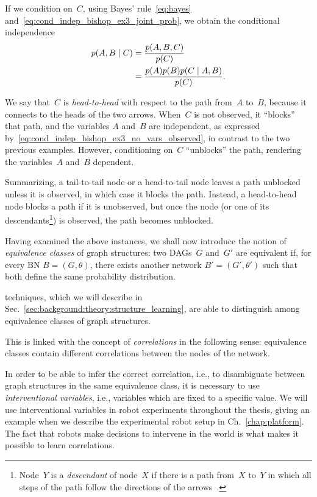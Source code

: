 If we condition on~$C$, using Bayes' rule~\eqref{eq:bayes} and~\eqref{eq:cond_indep_bishop_ex3_joint_prob}, we obtain the conditional independence
\begin{align*}
\begin{split}
  p(A,B \mid C) &= \frac{p(A,B,C)}{p(C)} \\
                  &= \frac{p(A) p(B) p(C \mid A,B)}{p(C)}.
\end{split}
\end{align*}

We say that~$C$ is \emph{head-to-head} with respect to the path from~$A$ to~$B$, because it connects to the heads of the two arrows. \label{head_to_head}
When~$C$ is not observed, it ``blocks'' that path, and the variables $A$ and~$B$ are independent, as expressed by~\eqref{eq:cond_indep_bishop_ex3_no_vars_observed}, in contrast to the two previous examples.
However, conditioning on~$C$ ``unblocks'' the path, rendering the variables~$A$ and~$B$ dependent.

Summarizing, a tail-to-tail node or a head-to-tail node leaves a path unblocked unless it is observed, in which case it blocks the path.
Instead, a head-to-head node blocks a path if it is unobserved, but once the node
(or one of its descendants\footnote{Node~$Y$ is a \emph{descendant} of node~$X$ if there is a path from~$X$ to~$Y$ in which all steps of the path follow the directions of the arrows~\cite[p.~376]{bishop:prml}.})
is observed, the path becomes unblocked.

Having examined the above instances, we shall now introduce the notion of \emph{equivalence classes} of graph structures:
two \acp{DAG}~$G$ and~$G'$ are equivalent if, for every \ac{BN} $B = (G, \theta)$, there exists another network $B' = (G', \theta')$ such that both define the same probability distribution.

\StructureLearning{} techniques, which we will describe in Sec.~\ref{sec:background:theory:structure_learning}, are able to distinguish among equivalence classes of graph structures.

This is linked with the concept of \emph{correlations} in the following sense: equivalence classes contain different correlations between the nodes of the network.

In order to be able to infer the correct correlation, i.e., to disambiguate between graph structures in the same equivalence class, it is necessary to use \emph{interventional variables}, i.e., variables which are fixed to a specific value. \label{para:interventional_vars}
We will use interventional variables in robot experiments throughout the thesis, giving an example when we describe the experimental robot setup in Ch.~\ref{chap:platform}.
The fact that robots make decisions to intervene in the world is what makes it possible to learn correlations.

